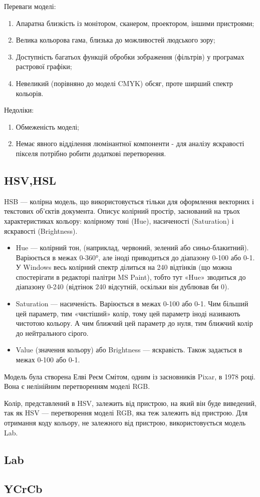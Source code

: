 Переваги моделі:
\begin{enumerate}
	\item Апаратна близкість із монітором, сканером, проектором, іншими пристроями;
	\item Велика кольорова гама, близька до можливостей людського зору;
	\item Доступність багатьох функцій обробки зображення (фільтрів) у програмах растрової графіки;
	\item Невеликий (порівняно до моделі CMYK) обсяг, проте ширший спектр кольорів.
\end{enumerate}
\bigbreak
Недоліки:
\begin{enumerate}
	\item Обмеженість моделі;
	\item Немає явного відділення люмінантної компоненти - для аналізу яскравості пікселя потрібно робити додаткові перетворення.
\end{enumerate}

\subsection{HSV,HSL}
HSB — колірна модель, що використовується тільки для оформлення векторних і текстових об'єктів документа. Описує колірний простір, заснований на трьох характеристиках кольору: колірному тоні (Hue), насиченості (Saturation) і яскравості (Brightness).

\begin{itemize}
	\item Hue — колірний тон, (наприклад, червоний, зелений або синьо-блакитний). Варіюється в межах 0-360°, але іноді приводиться до діапазону 0-100 або 0-1. У Windows весь колірний спектр ділиться на 240 відтінків (що можна спостерігати в редакторі палітри MS Paint), тобто тут «Hue» зводиться до діапазону 0-240 (відтінок 240 відсутній, оскільки він дублював би 0).

	\item Saturation — насиченість. Варіюється в межах 0-100 або 0-1. Чим більший цей параметр, тим «чистіший» колір, тому цей параметр іноді називають чистотою кольору. А чим ближчий цей параметр до нуля, тим ближчий колір до нейтрального сірого.
	
	\item Value (значення кольору) або Brightness — яскравість. Також задається в межах 0-100 або 0-1.
\end{itemize}

Модель була створена Елві Реєм Смітом, одним із засновників Pixar, в 1978 році. Вона є нелінійним перетворенням моделі RGB.

Колір, представлений в HSV, залежить від пристрою, на який він буде виведений, так як HSV — перетворення моделі RGB, яка теж залежить від пристрою. Для отримання коду кольору, не залежного від пристрою, використовується модель Lab.

\subsection{Lab}

\subsection{YCrCb}
